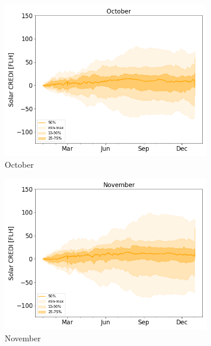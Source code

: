 \documentclass[a4paper,11pt]{extarticle}
\begin{document}
\begin{figure}[t]
\begin{subfigure}[t]{0.32\linewidth}
    \includegraphics[width=\linewidth]{Fig_CUMSUM_YearStart_SPV_October}
    \caption{October }
\end{subfigure}
\begin{subfigure}[t]{0.32\linewidth}
    \includegraphics[width=\linewidth]{Fig_CUMSUM_YearStart_SPV_November}
    \caption{November}
\end{subfigure}
\begin{subfigure}[t]{0.32\linewidth}

\end{subfigure}
\end{figure}
\end{document}
